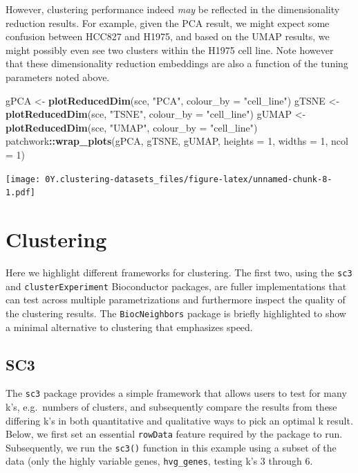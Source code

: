\documentclass[]{book}
\newenvironment{Shaded}{\begin{snugshade}}{\end{snugshade}}
\newcommand{\DataTypeTok}[1]{\textcolor[rgb]{0.13,0.29,0.53}{#1}}
\newcommand{\DecValTok}[1]{\textcolor[rgb]{0.00,0.00,0.81}{#1}}
\newcommand{\KeywordTok}[1]{\textcolor[rgb]{0.13,0.29,0.53}{\textbf{#1}}}
\newcommand{\NormalTok}[1]{#1}
\newcommand{\OperatorTok}[1]{\textcolor[rgb]{0.81,0.36,0.00}{\textbf{#1}}}
\newcommand{\StringTok}[1]{\textcolor[rgb]{0.31,0.60,0.02}{#1}}
\begin{document}
However, clustering performance indeed \emph{may} be reflected in the dimensionality reduction results. For example, given the PCA result, we might expect some confusion between HCC827 and H1975, and based on the UMAP results, we might possibly even see two clusters within the H1975 cell line. Note however that these dimensionality reduction embeddings are also a function of the tuning parameters noted above.

\begin{Shaded}
\begin{Highlighting}[]
\NormalTok{gPCA <-}\StringTok{ }\KeywordTok{plotReducedDim}\NormalTok{(sce, }\StringTok{"PCA"}\NormalTok{, }\DataTypeTok{colour_by =} \StringTok{"cell_line"}\NormalTok{)}
\NormalTok{gTSNE <-}\StringTok{ }\KeywordTok{plotReducedDim}\NormalTok{(sce, }\StringTok{"TSNE"}\NormalTok{, }\DataTypeTok{colour_by =} \StringTok{"cell_line"}\NormalTok{)}
\NormalTok{gUMAP <-}\StringTok{ }\KeywordTok{plotReducedDim}\NormalTok{(sce, }\StringTok{"UMAP"}\NormalTok{, }\DataTypeTok{colour_by =} \StringTok{"cell_line"}\NormalTok{)}
\NormalTok{patchwork}\OperatorTok{::}\KeywordTok{wrap_plots}\NormalTok{(gPCA, gTSNE, gUMAP, }\DataTypeTok{heights =} \DecValTok{1}\NormalTok{, }\DataTypeTok{widths =} \DecValTok{1}\NormalTok{, }\DataTypeTok{ncol =} \DecValTok{1}\NormalTok{)}
\end{Highlighting}
\end{Shaded}

\texttt{[image: 0Y.clustering-datasets\_files/figure-latex/unnamed-chunk-8-1.pdf]}

\hypertarget{clustering}{%
\section{Clustering}\label{clustering}}

Here we highlight different frameworks for clustering. The first two, using the \texttt{sc3} and \texttt{clusterExperiment} Bioconductor packages, are fuller implementations that can test across multiple parametrizations and furthermore inspect the quality of the clustering results. The \texttt{BiocNeighbors} package is briefly highlighted to show a minimal alternative to clustering that emphasizes speed.

\hypertarget{sc3}{%
\subsection{SC3}\label{sc3}}

The \texttt{sc3} package provides a simple framework that allows users to test for many k's, e.g.~numbers of clusters, and subsequently compare the results from these differing k's in both quantitative and qualitative ways to pick an optimal k result. Below, we first set an essential \texttt{rowData} feature required by the package to run. Subsequently, we run the \texttt{sc3()} function in this example using a subset of the data (only the highly variable genes, \texttt{hvg\_genes}, testing k's 3 through 6.
\end{document}
